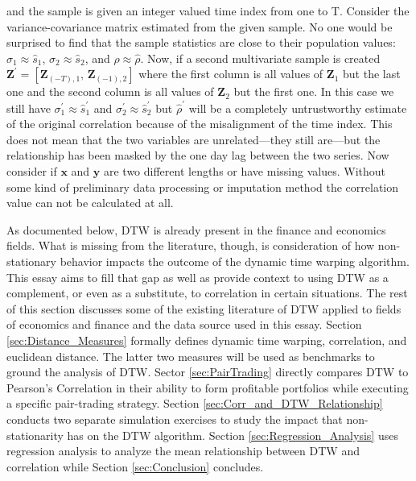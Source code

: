 \documentclass[12pt]{report}
\begin{document}
and the sample is given an integer valued time index from one to T. Consider the variance-covariance matrix estimated from the given sample. No one would be surprised to find that the sample statistics are close to their population values: $\sigma_{1} \approx \hat{s}_{1}$, $\sigma_{2} \approx \hat{s}_{2}$, and $\rho \approx \hat{\rho}$. Now, if a second multivariate sample is created $\boldsymbol{Z}^\prime = [\boldsymbol{Z}_{(-T), 1}, \, \boldsymbol{Z}_{(-1), 2}]$ where the first column is all values of $\boldsymbol{Z}_{1}$ but the last one and the second column is all values of $\boldsymbol{Z}_{2}$ but the first one. In this case we still have $\sigma^{\prime}_{1} \approx \hat{s}^{\prime}_{1}$ and $\sigma^{\prime}_{2} \approx \hat{s}^{\prime}_{2}$ but $\hat{\rho}^{\prime}$ will be a completely untrustworthy estimate of the original correlation because of the misalignment of the time index. This does not mean that the two variables are unrelated---they still are---but the relationship has been masked by the one day lag between the two series. Now consider if $\boldsymbol{x}$ and $\boldsymbol{y}$ are two different lengths or have missing values. Without some kind of preliminary data processing or imputation method the correlation value can not be calculated at all.

As documented below, DTW is already present in the finance and economics fields. What is missing from the literature, though, is consideration of how non-stationary behavior impacts the outcome of the dynamic time warping algorithm. This essay aims to fill that gap as well as provide context to using DTW as a complement, or even as a substitute, to correlation in certain situations. The rest of this section discusses some of the existing literature of DTW applied to fields of economics and finance and the data source used in this essay. Section \ref{sec:Distance_Measures} formally defines dynamic time warping, correlation, and euclidean distance. The latter two measures will be used as benchmarks to ground the analysis of DTW. Sector \ref{sec:PairTrading} directly compares DTW to Pearson's Correlation in their ability to form profitable portfolios while executing a specific pair-trading strategy. Section \ref{sec:Corr_and_DTW_Relationship} conducts two separate simulation exercises to study the impact that non-stationarity has on the DTW algorithm. Section \ref{sec:Regression_Analysis} uses regression analysis to analyze the mean relationship between DTW and correlation while Section \ref{sec:Conclusion} concludes.
\end{document}
